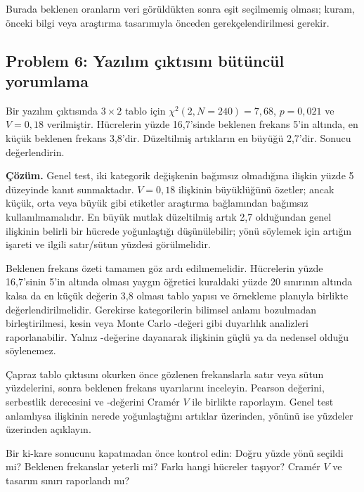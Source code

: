 Burada beklenen oranların veri görüldükten sonra eşit seçilmemiş olması;
kuram, önceki bilgi veya araştırma tasarımıyla önceden gerekçelendirilmesi
gerekir.

\subsection*{Problem 6: Yazılım çıktısını bütüncül yorumlama}

Bir yazılım çıktısında $3\times2$ tablo için
$\chi^2(2,N=240)=7{,}68$, $p=0{,}021$ ve $V=0{,}18$ verilmiştir. Hücrelerin
yüzde 16,7'sinde beklenen frekans 5'in altında, en küçük beklenen frekans
3,8'dir. Düzeltilmiş artıkların en büyüğü 2,7'dir. Sonucu değerlendirin.

\textbf{Çözüm.} Genel test, iki kategorik değişkenin bağımsız olmadığına
ilişkin yüzde 5 düzeyinde kanıt sunmaktadır. $V=0{,}18$ ilişkinin büyüklüğünü
özetler; ancak küçük, orta veya büyük gibi etiketler araştırma bağlamından
bağımsız kullanılmamalıdır. En büyük mutlak düzeltilmiş artık 2,7 olduğundan
genel ilişkinin belirli bir hücrede yoğunlaştığı düşünülebilir; yönü söylemek
için artığın işareti ve ilgili satır/sütun yüzdesi görülmelidir.

Beklenen frekans özeti tamamen göz ardı edilmemelidir. Hücrelerin yüzde
16,7'sinin 5'in altında olması yaygın öğretici kuraldaki yüzde 20 sınırının
altında kalsa da en küçük değerin 3,8 olması tablo yapısı ve örnekleme planıyla
birlikte değerlendirilmelidir. Gerekirse kategorilerin bilimsel anlamı
bozulmadan birleştirilmesi, kesin veya Monte Carlo \pval-değeri gibi duyarlılık
analizleri raporlanabilir. Yalnız \pval-değerine dayanarak ilişkinin güçlü ya da
nedensel olduğu söylenemez.

\begin{outputguidebox}
Çapraz tablo çıktısını okurken önce gözlenen frekanslarla satır veya sütun
yüzdelerini, sonra beklenen frekans uyarılarını inceleyin. Pearson değerini,
serbestlik derecesini ve \pval-değerini Cramér $V$ ile birlikte raporlayın. Genel
test anlamlıysa ilişkinin nerede yoğunlaştığını artıklar üzerinden, yönünü ise
yüzdeler üzerinden açıklayın.
\end{outputguidebox}





\begin{etkinlik}
Bir ki-kare sonucunu kapatmadan önce kontrol edin: Doğru yüzde yönü seçildi mi?
Beklenen frekanslar yeterli mi? Farkı hangi hücreler taşıyor? Cramér $V$ ve
tasarım sınırı raporlandı mı?
\end{etkinlik}

